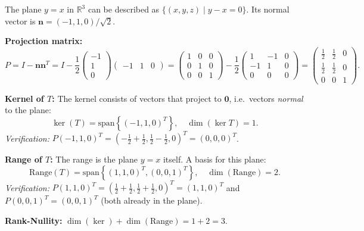 \documentclass[12pt,a3paper]{article}
\begin{document}
\begin{tcolorbox}[enhanced,breakable,
  colback=cF!4,colframe=cF,boxrule=0.8pt,arc=5pt,
  title={\textbf{Answer --- Kernel \& Range of Projection onto Plane $y=x$ in $\mathbb{R}^3$}},
  fonttitle=\bfseries\color{white},colbacktitle=cF]

The plane $y=x$ in $\mathbb{R}^3$ can be described as $\{(x,y,z)\mid y-x=0\}$. Its normal vector is $\mathbf{n}=(-1,1,0)/\sqrt{2}$.

\textbf{Projection matrix:}
\[
P=I-\mathbf{n}\mathbf{n}^T=I-\frac{1}{2}\begin{pmatrix}-1\\1\\0\end{pmatrix}\begin{pmatrix}-1&1&0\end{pmatrix}
=\begin{pmatrix}1&0&0\\0&1&0\\0&0&1\end{pmatrix}-\frac{1}{2}\begin{pmatrix}1&-1&0\\-1&1&0\\0&0&0\end{pmatrix}
=\begin{pmatrix}\frac{1}{2}&\frac{1}{2}&0\\[4pt]\frac{1}{2}&\frac{1}{2}&0\\0&0&1\end{pmatrix}.
\]

\textbf{Kernel of $T$:} The kernel consists of vectors that project to $\mathbf{0}$, i.e.\ vectors \emph{normal} to the plane:
\[
\ker(T)=\mathrm{span}\!\left\{(-1,1,0)^T\right\},\quad\dim(\ker T)=1.
\]
\textit{Verification:} $P(-1,1,0)^T=(-\tfrac{1}{2}+\tfrac{1}{2},\tfrac{1}{2}-\tfrac{1}{2},0)^T=(0,0,0)^T$. \checkmark

\textbf{Range of $T$:} The range is the plane $y=x$ itself. A basis for this plane:
\[
\mathrm{Range}(T)=\mathrm{span}\!\left\{(1,1,0)^T,(0,0,1)^T\right\},\quad\dim(\mathrm{Range})=2.
\]
\textit{Verification:} $P(1,1,0)^T=(\tfrac{1}{2}+\tfrac{1}{2},\tfrac{1}{2}+\tfrac{1}{2},0)^T=(1,1,0)^T$ \checkmark and $P(0,0,1)^T=(0,0,1)^T$ \checkmark (both already in the plane).

\textbf{Rank-Nullity:} $\dim(\ker)+\dim(\mathrm{Range})=1+2=3$. \checkmark

\end{tcolorbox}
\end{document}
